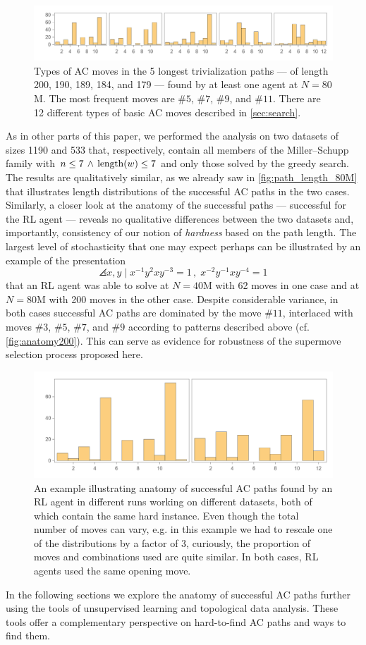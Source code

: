 \begin{figure}[h]
    \centering
	\includegraphics[scale=0.6]{fig/anatomy_some.png}
	\caption{Types of AC moves in the 5 longest trivialization paths --- of length 200, 190, 189, 184, and 179 --- found by at least one agent at $N=80$M. The most frequent moves are $\# 5$, $\# 7$, $\# 9$, and $\# 11$. There are 12 different types of basic AC moves described in \autoref{sec:search}.}
	\label{fig:anatomy_some}
\end{figure}

As in other parts of this paper, we performed the analysis on two datasets of sizes 1190 and 533 that, respectively, contain all members of the Miller–Schupp family with $n \leq 7 \, \land \, \operatorname{length}(w) \leq 7$ and only those solved by the greedy search. The results are qualitatively similar, as we already saw in \autoref{fig:path_length_80M} that illustrates length distributions of the successful AC paths in the two cases. Similarly, a closer look at the anatomy of the successful paths --- successful for the RL agent --- reveals no qualitative differences between the two datasets and, importantly, consistency of our notion of \textit{hardness} based on the path length. The largest level of stochasticity that one may expect perhaps can be illustrated by an example of the presentation
\[
\angles{x, y \mid x^{-1} y^2 x y^{-3} =1 \,, \; x^{-2} y^{-1} x y^{-4} =1 }
\]
that an RL agent was able to solve at $N=40$M with 62 moves in one case and at $N=80$M with 200 moves in the other case. Despite considerable variance, in both cases successful AC paths are dominated by the move $\# 11$, interlaced with moves $\# 3$, $\# 5$, $\# 7$, and $\# 9$ according to patterns described above (cf. \autoref{fig:anatomy200}). This can serve as evidence for robustness of the supermove selection process proposed here.

\begin{figure}[h]
    \centering
	\includegraphics[scale=0.55]{fig/anatomy200.png}
	\caption{An example illustrating anatomy of successful AC paths found by an RL agent in different runs working on different datasets, both of which contain the same hard instance. Even though the total number of moves can vary, e.g. in this example we had to rescale one of the distributions by a factor of 3, curiously, the proportion of moves and combinations used are quite similar. In both cases, RL agents used the same opening move.}
	\label{fig:anatomy200}
\end{figure}

In the following sections we explore the anatomy of successful AC paths further using the tools of unsupervised learning and topological data analysis. These tools offer a complementary perspective on hard-to-find AC paths and ways to find them.
